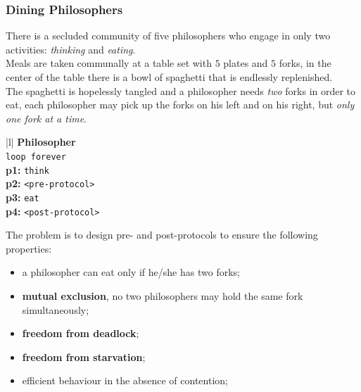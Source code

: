 \subsubsection{Dining Philosophers}\label{sub:pi_dining_philosophers} %
There is a secluded community of five philosophers who engage in only two activities: \textit{thinking} and \textit{eating}.
\\
Meals are taken communally at a table set with $5$ plates and $5$ forks, in the center of the table there is a bowl of spaghetti that is endlessly replenished.
\\
The spaghetti is hopelessly tangled and a philosopher needs \textit{two} forks in order to eat, each philosopher may pick up the forks on his left and on his right, but \textit{only one fork at a time}.
\begin{ctable}{|l|}
    \hline
    \textbf{Philosopher} \\
    \hline
    \texttt{loop forever} \\
    \textbf{p1:} \texttt{think}\\
    \textbf{p2:} \texttt{<pre-protocol>}\\
    \textbf{p3:} \texttt{eat}\\
    \textbf{p4:} \texttt{<post-protocol>}\\
    \hline
\end{ctable}
The problem is to design pre- and post-protocols to ensure the following properties:
\begin{itemize}
    \item a philosopher can eat only if he/she has two forks;
    \item \textbf{mutual exclusion}, no two philosophers may hold the same fork simultaneously;
    \item \textbf{freedom from deadlock};
    \item \textbf{freedom from starvation};
    \item efficient behaviour in the absence of contention;
\end{itemize}
%
